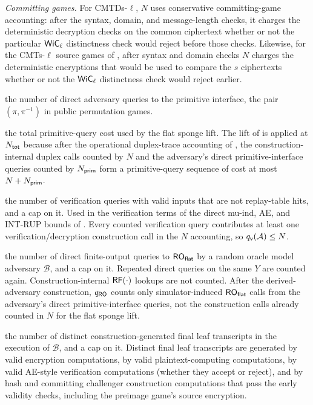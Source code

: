 \begin{description}
  \emph{Committing games.} For CMTDs-$\ell$, $N$ uses conservative
  committing-game accounting: after the syntax, domain, and message-length
  checks, it charges the deterministic decryption checks on the common
  ciphertext whether or not the particular $\mathsf{WiC}_\ell$ distinctness check would
  reject before those checks. Likewise, for the CMTs-$\ell$ source games of
  , after syntax and domain checks $N$ charges
  the deterministic encryptions that would be used to compare the $s$
  ciphertexts whether or not the $\mathsf{WiC}_\ell$ distinctness check would reject
  earlier.
\item[$\Nprim$:] the number of direct adversary queries to the
  primitive interface, the pair $(\pi, \pi^{-1})$ in
  public permutation games.
\item[$\Ntot = N + \Nprim$:] the total primitive-query cost
  used by the flat sponge lift. The lift of
   is applied at $N_{\mathsf{tot}}$ because after the
  operational duplex-trace accounting of
  , the construction-internal duplex
  calls counted by $N$ and the adversary's direct primitive-interface
  queries counted by $\Nprim$ form a primitive-query sequence of cost at
  most $N+N_{\mathsf{prim}}$.
\item[$\qv(\mathcal{A})$, $\Qv$:] the number of verification queries
  with valid inputs that are not replay-table hits, and a cap on it.
  Used in the verification terms of the direct mu-ind, AE, and
  \textsf{INT-RUP} bounds of . Every counted
  verification query contributes at least
  one verification/decryption
  construction call in the $N$ accounting, so $q_{\mathsf{v}}(\mathcal{A}) \leq N$.
\item[$\qRO(\mathcal{B})$, $\QRO$:] the number of direct
  finite-output queries to $\mathsf{RO}_{\mathsf{flat}}$ by a random oracle model adversary
  $\mathcal{B}$, and a cap on it. Repeated direct queries on the same
  $Y$ are counted again. Construction-internal $\mathsf{RF}(\cdot)$ lookups are
  not counted. After the derived-adversary construction, $q_{\mathsf{RO}}$ counts only
  simulator-induced $\mathsf{RO}_{\mathsf{flat}}$ calls from the adversary's direct
  primitive-interface queries, not the construction calls already
  counted in $N$ for the flat sponge lift.
\item[$\nleaf(\mathcal{B})$, $\Nleaf$:] the number of distinct
  construction-generated final leaf transcripts in the execution of
  $\mathcal{B}$, and a cap on it. Distinct final leaf transcripts are
  generated by valid encryption computations, by valid plaintext-computing
  computations, by valid AE-style
  verification computations (whether they accept or reject), and by
  hash and committing challenger construction computations that pass the
  early validity checks, including the preimage game's source encryption.
\end{description}

